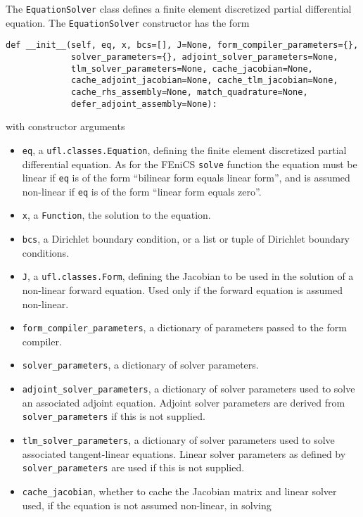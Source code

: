 \documentclass[11pt]{article}
\begin{document}
The \texttt{EquationSolver} class defines a finite element discretized partial
differential equation. The \texttt{EquationSolver} constructor has the form
\begin{lstlisting}
def __init__(self, eq, x, bcs=[], J=None, form_compiler_parameters={},
             solver_parameters={}, adjoint_solver_parameters=None,
             tlm_solver_parameters=None, cache_jacobian=None,
             cache_adjoint_jacobian=None, cache_tlm_jacobian=None,
             cache_rhs_assembly=None, match_quadrature=None,
             defer_adjoint_assembly=None):
\end{lstlisting}
with constructor arguments
\begin{itemize}
  \item \texttt{eq}, a \texttt{ufl.classes.Equation}, defining the finite
    element discretized partial differential equation. As for the FEniCS
    \texttt{solve} function the equation must be linear if \texttt{eq} is of
    the form ``bilinear form equals linear form'', and is assumed non-linear if
    \texttt{eq} is of the form ``linear form equals zero''.
  \item \texttt{x}, a \texttt{Function}, the solution to the equation.
  \item \texttt{bcs}, a Dirichlet boundary condition, or a list or tuple of
    Dirichlet boundary conditions.
  \item \texttt{J}, a \texttt{ufl.classes.Form}, defining the Jacobian to be
    used in the solution of a non-linear forward equation. Used only if the
    forward equation is assumed non-linear.
  \item \texttt{form\_compiler\_parameters}, a dictionary of parameters passed
    to the form compiler.
  \item \texttt{solver\_parameters}, a dictionary of solver parameters.
  \item \texttt{adjoint\_solver\_parameters}, a dictionary of solver parameters
    used to solve an associated adjoint equation. Adjoint solver parameters are
    derived from \texttt{solver\_parameters} if this is not supplied.
  \item \texttt{tlm\_solver\_parameters}, a dictionary of solver parameters
    used to solve associated tangent-linear equations. Linear solver parameters
    as defined by \texttt{solver\_parameters} are used if this is not supplied.
  \item \texttt{cache\_jacobian}, whether to cache the Jacobian matrix and
    linear solver used, if the equation is not assumed non-linear, in solving

\end{itemize}
\end{document}
